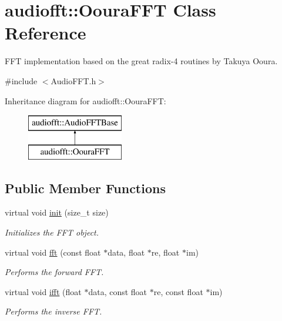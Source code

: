 \hypertarget{classaudiofft_1_1_ooura_f_f_t}{}\section{audiofft\+:\+:Ooura\+F\+FT Class Reference}
\label{classaudiofft_1_1_ooura_f_f_t}


F\+FT implementation based on the great radix-\/4 routines by Takuya Ooura.  




{\ttfamily \#include $<$Audio\+F\+F\+T.\+h$>$}

Inheritance diagram for audiofft\+:\+:Ooura\+F\+FT\+:\begin{figure}[H]
\begin{center}
\leavevmode
\includegraphics[height=2.000000cm]{classaudiofft_1_1_ooura_f_f_t}
\end{center}
\end{figure}
\subsection*{Public Member Functions}
\begin{DoxyCompactItemize}
\item 
virtual void \hyperlink{classaudiofft_1_1_ooura_f_f_t_ad5e0f74be03f4b76f134a7fcfe4718d9}{init} (size\+\_\+t size)
\begin{DoxyCompactList}\small\item\em Initializes the F\+FT object. \end{DoxyCompactList}\item 
virtual void \hyperlink{classaudiofft_1_1_ooura_f_f_t_ad3eb09412d2ee5596e65b409915bc32a}{fft} (const float $\ast$data, float $\ast$re, float $\ast$im)
\begin{DoxyCompactList}\small\item\em Performs the forward F\+FT. \end{DoxyCompactList}\item 
virtual void \hyperlink{classaudiofft_1_1_ooura_f_f_t_a751001432c5a03a99ae9684c71864d56}{ifft} (float $\ast$data, const float $\ast$re, const float $\ast$im)
\begin{DoxyCompactList}\small\item\em Performs the inverse F\+FT. \end{DoxyCompactList}\end{DoxyCompactItemize}
